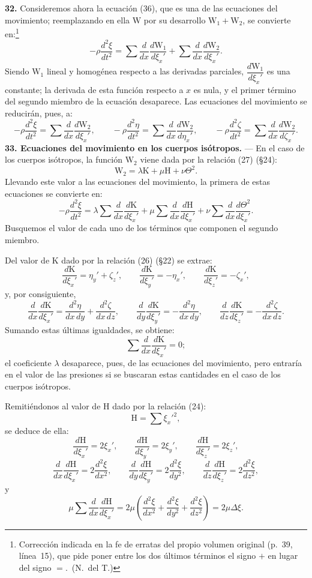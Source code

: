 \noindent\textbf{32.} Consideremos ahora la ecuación (36), que es una de las ecuaciones del
movimiento; reemplazando en ella $\mathrm{W}$ por su desarrollo
$\mathrm{W}_1+\mathrm{W}_2$, se convierte en:\footnote{Corrección indicada en
la fe de erratas del propio volumen original (p.~39, línea~15), que pide
poner entre los dos últimos términos el signo $+$ en lugar del signo $=$.~(N.~del T.)}
\[
-\rho\frac{d^2\xi}{dt^2}=\sum\frac{d}{dx}\frac{d\mathrm{W}_1}{d\xi_x'}
+\sum\frac{d}{dx}\frac{d\mathrm{W}_2}{d\xi_x'}.
\]
Siendo $\mathrm{W}_1$ lineal y homogénea respecto a las derivadas
parciales, $\dfrac{d\mathrm{W}_1}{d\xi_x'}$ es una constante; la derivada
de esta función respecto a $x$ es nula, y el primer término del segundo
miembro de la ecuación desaparece. Las ecuaciones del movimiento se
reducirán, pues, a:
\[
-\rho\frac{d^2\xi}{dt^2}=\sum\frac{d}{dx}\frac{d\mathrm{W}_2}{d\xi_x'},\qquad
-\rho\frac{d^2\eta}{dt^2}=\sum\frac{d}{dx}\frac{d\mathrm{W}_2}{d\eta_x'},\qquad
-\rho\frac{d^2\zeta}{dt^2}=\sum\frac{d}{dx}\frac{d\mathrm{W}_2}{d\zeta_x'}.
\]
\noindent\textbf{33. Ecuaciones del movimiento en los cuerpos isótropos.}
— En el caso de los cuerpos isótropos, la función $\mathrm{W}_2$ viene dada
por la relación (27) (§24):
\[
\mathrm{W}_2=\lambda\mathrm{K}+\mu\mathrm{H}+\nu\Theta^2.
\]
Llevando este valor a las ecuaciones del movimiento, la primera de estas
ecuaciones se convierte en:
\[
-\rho\frac{d^2\xi}{dt^2}=\lambda\sum\frac{d}{dx}\frac{d\mathrm{K}}{d\xi_x'}
+\mu\sum\frac{d}{dx}\frac{d\mathrm{H}}{d\xi_x'}+\nu\sum\frac{d}{dx}\frac{d\Theta^2}{d\xi_x'}.
\]
Busquemos el valor de cada uno de los términos que componen el segundo
miembro.

Del valor de $\mathrm{K}$ dado por la relación (26) (§22) se extrae:
\[
\frac{d\mathrm{K}}{d\xi_x'}=\eta_y'+\zeta_z',\qquad
\frac{d\mathrm{K}}{d\xi_y'}=-\eta_x',\qquad
\frac{d\mathrm{K}}{d\xi_z'}=-\zeta_x',
\]
y, por consiguiente,
\[
\frac{d}{dx}\frac{d\mathrm{K}}{d\xi_x'}=\frac{d^2\eta}{dx\,dy}+\frac{d^2\zeta}{dx\,dz},\qquad
\frac{d}{dy}\frac{d\mathrm{K}}{d\xi_y'}=-\frac{d^2\eta}{dx\,dy},\qquad
\frac{d}{dz}\frac{d\mathrm{K}}{d\xi_z'}=-\frac{d^2\zeta}{dx\,dz}.
\]
Sumando estas últimas igualdades, se obtiene:
\[
\sum\frac{d}{dx}\frac{d\mathrm{K}}{d\xi_x'}=0;
\]
el coeficiente $\lambda$ desaparece, pues, de las ecuaciones del
movimiento, pero entraría en el valor de las presiones si se buscaran
estas cantidades en el caso de los cuerpos isótropos.

Remitiéndonos al valor de $\mathrm{H}$ dado por la relación (24):
\[
\mathrm{H}=\sum\xi_x'^2,
\]
se deduce de ella:
\[
\frac{d\mathrm{H}}{d\xi_x'}=2\xi_x',\qquad \frac{d\mathrm{H}}{d\xi_y'}=2\xi_y',
\qquad \frac{d\mathrm{H}}{d\xi_z'}=2\xi_z',
\]
\[
\frac{d}{dx}\frac{d\mathrm{H}}{d\xi_x'}=2\frac{d^2\xi}{dx^2},\qquad
\frac{d}{dy}\frac{d\mathrm{H}}{d\xi_y'}=2\frac{d^2\xi}{dy^2},\qquad
\frac{d}{dz}\frac{d\mathrm{H}}{d\xi_z'}=2\frac{d^2\xi}{dz^2},
\]
y
\[
\mu\sum\frac{d}{dx}\frac{d\mathrm{H}}{d\xi_x'}
=2\mu\left(\frac{d^2\xi}{dx^2}+\frac{d^2\xi}{dy^2}+\frac{d^2\xi}{dz^2}\right)
=2\mu\Delta\xi.
\]

